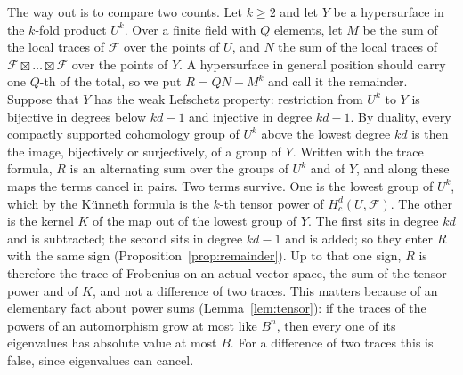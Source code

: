\documentclass[11pt,a4paper]{article}
\theoremstyle{plain}
\theoremstyle{remark}
\newcommand{\F}{\mathcal F}
\begin{document}
The way out is to compare two counts. Let $k\ge2$ and let $Y$ be a hypersurface in the $k$-fold product $U^k$. Over a
finite field with $Q$ elements, let $M$ be the sum of the local traces of $\F$ over the points of $U$, and $N$ the
sum of the local traces of $\F\boxtimes\dots\boxtimes\F$ over the points of $Y$. A hypersurface in general position
should carry one $Q$-th of the total, so we put $R=QN-M^k$ and call it the remainder. Suppose that $Y$ has the weak
Lefschetz property: restriction from $U^k$ to $Y$ is bijective in degrees below $kd-1$ and injective in degree
$kd-1$. By duality, every compactly supported cohomology group of $U^k$ above the lowest degree $kd$ is then the
image, bijectively or surjectively, of a group of $Y$. Written with the trace formula, $R$ is an alternating sum over
the groups of $U^k$ and of $Y$, and along these maps the terms cancel in pairs. Two terms survive. One is the lowest
group of $U^k$, which by the K\"unneth formula is the $k$-th tensor power of $H^d_c(U,\F)$. The other is the kernel
$K$ of the map out of the lowest group of $Y$. The first sits in degree $kd$ and is subtracted; the second sits in
degree $kd-1$ and is added; so they enter $R$ with the same sign (Proposition~\ref{prop:remainder}). Up to that one
sign, $R$ is therefore the trace of Frobenius on an actual vector space, the sum of the tensor power and of $K$, and
not a difference of two traces. This matters because of an elementary fact about power sums
(Lemma~\ref{lem:tensor}): if the traces of the powers of an automorphism grow at most like $B^n$, then every one of
its eigenvalues has absolute value at most $B$. For a difference of two traces this is false, since eigenvalues can
cancel.
\end{document}
